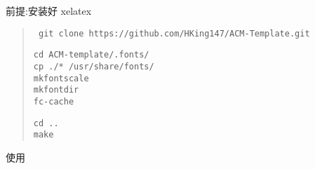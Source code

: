 前提:安装好 xelatex

\begin{quote}
\begin{verbatim}
 git clone https://github.com/HKing147/ACM-Template.git
\end{verbatim}

\begin{verbatim}
cd ACM-template/.fonts/
cp ./* /usr/share/fonts/
mkfontscale
mkfontdir
fc-cache
\end{verbatim}

\begin{verbatim}
cd ..
make
\end{verbatim}
\end{quote}

使用
